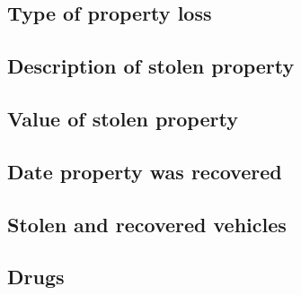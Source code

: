 \documentclass[
  12pt,
  openany]{book}
\begin{document}
\hypertarget{type-of-property-loss}{%
\subsection{Type of property loss}\label{type-of-property-loss}}

\hypertarget{description-of-stolen-property}{%
\subsection{Description of stolen property}\label{description-of-stolen-property}}

\hypertarget{value-of-stolen-property}{%
\subsection{Value of stolen property}\label{value-of-stolen-property}}

\hypertarget{date-property-was-recovered}{%
\subsection{Date property was recovered}\label{date-property-was-recovered}}

\hypertarget{stolen-and-recovered-vehicles}{%
\subsection{Stolen and recovered vehicles}\label{stolen-and-recovered-vehicles}}

\hypertarget{drugs}{%
\subsection{Drugs}\label{drugs}}

  
\end{document}
